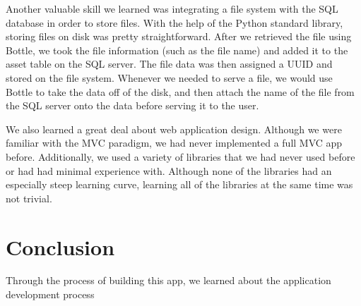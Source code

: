 \documentclass[12pt]{article}
\begin{document}
Another valuable skill we learned was integrating a file system with the SQL
database in order to store files. With the help of the Python standard library,
storing files on disk was pretty straightforward. After we retrieved the file
using Bottle, we took the file information (such as the file name) and added it
to the asset table on the SQL server. The file data was then assigned a UUID and
stored on the file system. Whenever we needed to serve a file, we would use
Bottle to take the data off of the disk, and then attach the name of the file
from the SQL server onto the data before serving it to the user.

We also learned a great deal about web application design. Although we were
familiar with the MVC paradigm, we had never implemented a full MVC app before.
Additionally, we used a variety of libraries that we had never used before or
had had minimal experience with. Although none of the libraries had an
especially steep learning curve, learning all of the libraries at the same time
was not trivial.

\section{Conclusion}
Through the process of building this app, we learned about the application
development process
\end{document}
